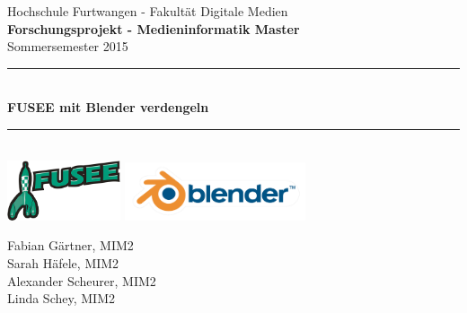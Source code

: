 \begin{titlepage}

\newcommand{\HRule}{\rule{\linewidth}{0.5mm}} %

\center %
 

\Large Hochschule Furtwangen - Fakultät Digitale Medien\\[0.5cm] %
{\Large \bfseries Forschungsprojekt - Medieninformatik Master}\\[0.5cm] %
\large Sommersemester 2015\\[0.5cm] %


\HRule \\[0.2cm]
{ \huge \bfseries FUSEE mit Blender verdengeln}\\[0cm] %
\HRule \\[0.7cm]
 
\includegraphics[width=0.25\textwidth]{images/FuseeLogo375}
\includegraphics[width=0.4\textwidth]{images/blender_logo}\\[1cm]


\begin{minipage}{0.55\textwidth}
\begin{flushleft} \large
Fabian Gärtner, MIM2\\
Sarah Häfele, MIM2\\
Alexander Scheurer, MIM2\\
Linda Schey, MIM2\\


\end{flushleft}
\end{minipage}
\end{titlepage}
